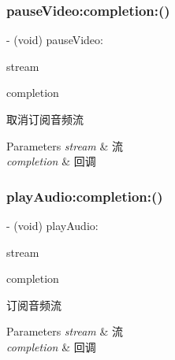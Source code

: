 \subsubsection{\texorpdfstring{pause\+Video\+:completion\+:()}{pauseVideo:completion:()}}
{\footnotesize\ttfamily -\/ (void) pause\+Video\+: \begin{DoxyParamCaption}\item[{(\hyperlink{interface_c_c_stream}{C\+C\+Stream} $\ast$)}]{stream }\item[{completion:(C\+C\+Comletion\+Block)}]{completion }\end{DoxyParamCaption}}

取消订阅音频流 
\begin{DoxyParams}{Parameters}
{\em stream} & 流 \\
\hline
{\em completion} & 回调 \\
\hline
\end{DoxyParams}
\mbox{\label{interface_c_c_streamer_basic_a6ed3877a3e3d2a4a9cb3be32b566b261}} 
\subsubsection{\texorpdfstring{play\+Audio\+:completion\+:()}{playAudio:completion:()}}
{\footnotesize\ttfamily -\/ (void) play\+Audio\+: \begin{DoxyParamCaption}\item[{(\hyperlink{interface_c_c_stream}{C\+C\+Stream} $\ast$)}]{stream }\item[{completion:(C\+C\+Comletion\+Block)}]{completion }\end{DoxyParamCaption}}

订阅音频流 
\begin{DoxyParams}{Parameters}
{\em stream} & 流 \\
\hline
{\em completion} & 回调 \\
\hline
\end{DoxyParams}
\mbox{\label{interface_c_c_streamer_basic_afe7bec4a43b1b497fec36b061c0ea090}} 
